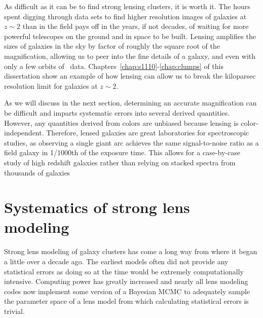 As difficult as it can be to find strong lensing clusters, it is worth it. The hours spent digging through data sets to find higher resolution images of galaxies at $z\sim2$ than in the field pays off in the years, if not decades, of waiting for more powerful telescopes on the ground and in space to be built. Lensing amplifies the sizes of galaxies in the sky by factor of roughly the square root of the magnification, allowing us to peer into the fine details of a galaxy, and even with only a few orbits of \hst\ data. Chapters~\ref{chap:s1110}-\ref{chap:clumps} of this dissertation show an example of how lensing can allow us to break the kiloparsec resolution limit for galaxies at $z\sim2$. 

As we will discuss in the next section, determining an accurate magnification can be difficult and imparts systematic errors into several derived quantities. However, any quantities derived from colors are unbiased because lensing is color-independent. Therefore, lensed galaxies are great laboratories for spectroscopic studies, as observing a single giant arc achieves the same signal-to-noise ratio as a field galaxy in 1/1000th of the exposure time. This allows for a case-by-case study of high redshift galaxies \citep[e.g., ][]{Rigby:2018hs,Rigby:2017yb} rather than relying on stacked spectra from thousands of galaxies \citep[e.g., ][]{Shapley:2003fk}

\section{Systematics of strong lens modeling}

Strong lens modeling of galaxy clusters has come a long way from where it began a little over a decade ago. The earliest models often did not provide any statistical errors as doing so at the time would be extremely computationally intensive. Computing power has greatly increased and nearly all lens modeling codes now implement some version of a Bayesian MCMC to adequately sample the parameter space of a lens model from which calculating statistical errors is trivial.

